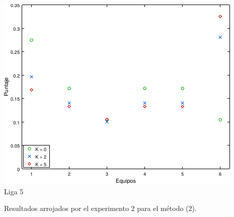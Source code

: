             \noindent{} \begin{minipage}{\textwidth}
                \begin{center}
                    \includegraphics{graficos/exp3-partidos-liga5-K} \\
                    {\small Liga 5}

                    \vspace{1em}

                    Resultados arrojados por el experimento 2 para el método (2).

                    \vspace{1em}
                \end{center}
            \end{minipage}


